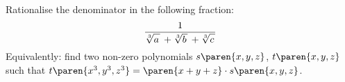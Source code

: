 Rationalise the denominator in the following fraction:
\begin{equation*}
  \frac{1}{
    \sqrt[3]{a \vphantom{b c} \mspace{2mu}} \,
    + \sqrt[3]{b \vphantom{a c} \mspace{2mu}} \,
    + \sqrt[3]{c \vphantom{a b} \mspace{2mu}}
  }
\end{equation*}
Equivalently:\newline
find two non-zero polynomials $s\paren{x, y, z}$, $t\paren{x, y, z}$
such that $t\paren{x^3, y^3, z^3} = \paren{x + y + z} \cdot s\paren{x, y, z}$.
